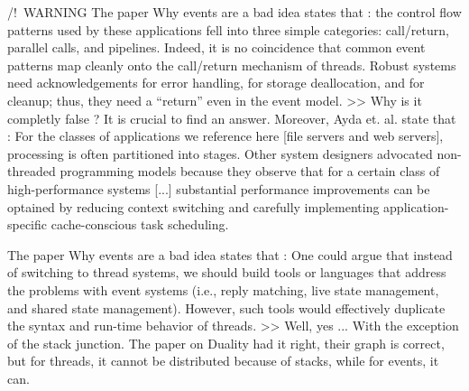 













/!\ WARNING
The paper Why events are a bad idea states that :
the control flow patterns used by these applications fell into three simple categories: call/return, parallel calls, and pipelines.
Indeed, it is no coincidence that common event patterns map cleanly onto the call/return mechanism of threads. Robust systems need acknowledgements for error handling, for storage deallocation, and for cleanup; thus, they need a “return” even in the event model.
>> Why is it completly false ?
	 It is crucial to find an answer.
Moreover, Ayda et. al. state that :
For the classes of applications we reference here [file servers and web servers], processing is often partitioned into stages.
Other system designers advocated non-threaded programming models because they observe that for a certain class of high-performance systems [...] substantial performance improvements can be optained by reducing context switching and carefully implementing application-specific cache-conscious task scheduling.


The paper Why events are a bad idea states that :
One could argue that instead of switching to thread systems, we should build tools or languages that address the problems with event systems (i.e., reply matching, live state management, and shared state management). However, such tools would effectively duplicate the syntax and run-time behavior of threads.
>> Well, yes ...
   With the exception of the stack junction.
   The paper on Duality had it right, their graph is correct, but for threads, it cannot be distributed because of stacks, while for events, it can.


